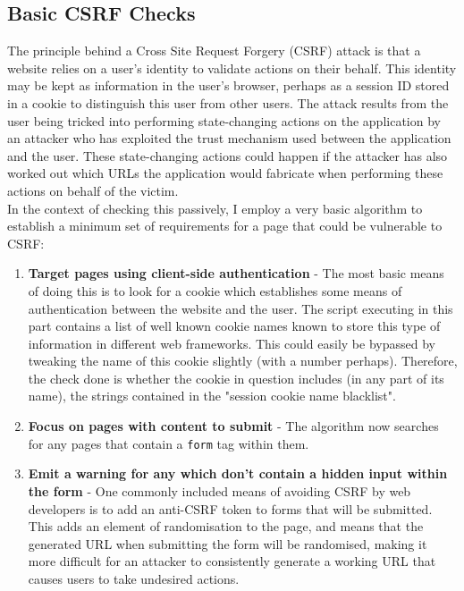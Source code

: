 \subsection{Basic CSRF Checks} \label{csrfChecks}

The principle behind a Cross Site Request Forgery (CSRF) attack is that a website relies on a user's identity to validate actions on their behalf. This identity may be kept as information in the user's browser, perhaps as a session ID stored in a cookie to distinguish this user from other users. The attack results from the user being tricked into performing state-changing actions on the application by an attacker who has exploited the trust mechanism used between the application and the user. These state-changing actions could happen if the attacker has also worked out which URLs the application would fabricate when performing these actions on behalf of the victim. \\

In the context of checking this passively, I employ a very basic algorithm to establish a minimum set of requirements for a page that could be vulnerable to CSRF:

\begin{enumerate}
	\item \textbf{Target pages using client-side authentication} - The most basic means of doing this is to look for a cookie which establishes some means of authentication between the website and the user. The script executing in this part contains a list of well known cookie names known to store this type of information in different web frameworks. This could easily be bypassed by tweaking the name of this cookie slightly (with a number perhaps). Therefore, the check done is whether the cookie in question includes (in any part of its name), the strings contained in the "session cookie name blacklist".
	
	\item \textbf{Focus on pages with content to submit} - The algorithm now searches for any pages that contain a \texttt{form} tag within them. 
	
	\item \textbf{Emit a warning for any which don't contain a hidden input within the form} - One commonly included means of avoiding CSRF by web developers is to add an anti-CSRF token to forms that will be submitted. This adds an element of randomisation to the page, and means that the generated URL when submitting the form will be randomised, making it more difficult for an attacker to consistently generate a working URL that causes users to take undesired actions.
\end{enumerate}

